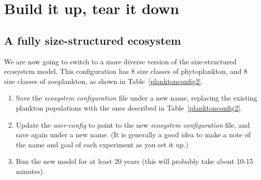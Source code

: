 \documentclass[11pt,fleqn]{book} %
\begin{document}

\newpage


\section{Build it up, tear it down}


\subsection{A fully size-structured  ecosystem} We are now going to switch to a more diverse version of the size-structured ecosystem model. This configuration has 8 size classes of phytoplankton, and 8 size classes of zooplankton, as shown in Table~\ref{planktonconfig2}.

\begin{enumerate}[noitemsep]
\vspace{1mm}
\item Save the \textit{ecosystem configuration} file under a new name, replacing the existing plankton populations with the ones described in Table~\ref{planktonconfig2}.
\vspace{1mm}
\item Update the \textit{user-config} to point to the new \textit{ecosystem configuration} file, and save again under a new name. (It is generally a good idea to make a note of the name and goal of each experiment as you set it up.)
\vspace{1mm}
\item Run the new model for at least 20 years (this will probably take about 10-15 minutes).
\end{enumerate}
\vspace{2mm}
\end{document}

